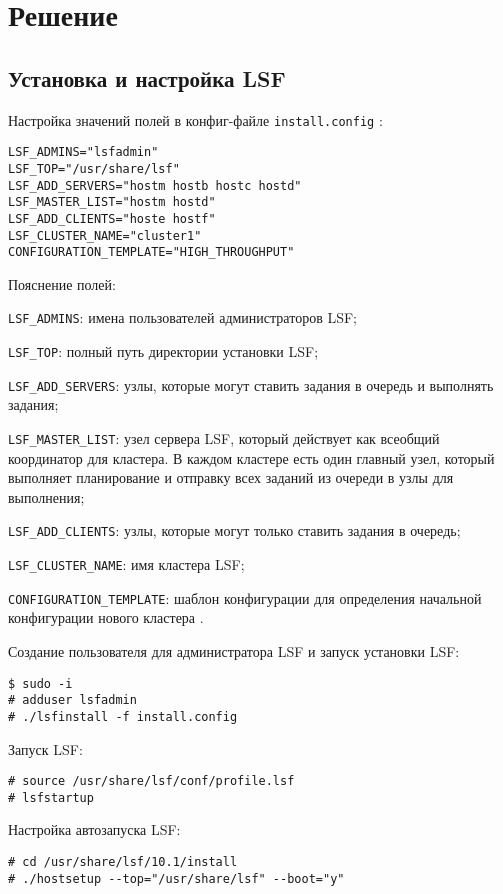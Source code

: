 \section{Решение} 


\subsection{Установка и настройка LSF}

Настройка значений полей в конфиг-файле \lstinline{install.config} \cite{install_plan}:
\begin{lstlisting}
LSF_ADMINS="lsfadmin"
LSF_TOP="/usr/share/lsf"
LSF_ADD_SERVERS="hostm hostb hostc hostd"
LSF_MASTER_LIST="hostm hostd"
LSF_ADD_CLIENTS="hoste hostf"
LSF_CLUSTER_NAME="cluster1"
CONFIGURATION_TEMPLATE="HIGH_THROUGHPUT"    
\end{lstlisting}

Пояснение полей:

\lstinline{LSF_ADMINS}: имена пользователей администраторов LSF;

\lstinline{LSF_TOP}: полный путь директории установки LSF;

\lstinline{LSF_ADD_SERVERS}: узлы, которые могут ставить задания в очередь и выполнять задания;

\lstinline{LSF_MASTER_LIST}: узел сервера LSF, который действует как всеобщий координатор для кластера. В каждом кластере есть один главный узел, который выполняет планирование и отправку всех заданий из очереди в узлы для выполнения;

\lstinline{LSF_ADD_CLIENTS}: узлы, которые могут только ставить задания в очередь;

\lstinline{LSF_CLUSTER_NAME}: имя кластера LSF;

\lstinline{CONFIGURATION_TEMPLATE}: шаблон конфигурации для определения начальной конфигурации нового кластера \cite{lsf_overview,host_types_models}.

Создание пользователя для администратора LSF и запуск установки LSF: 
\begin{lstlisting}
$ sudo -i
# adduser lsfadmin
# ./lsfinstall -f install.config
\end{lstlisting}

Запуск LSF:
\begin{lstlisting}
# source /usr/share/lsf/conf/profile.lsf
# lsfstartup
\end{lstlisting}

Настройка автозапуска LSF:
\begin{lstlisting}
# cd /usr/share/lsf/10.1/install
# ./hostsetup --top="/usr/share/lsf" --boot="y"
\end{lstlisting}


